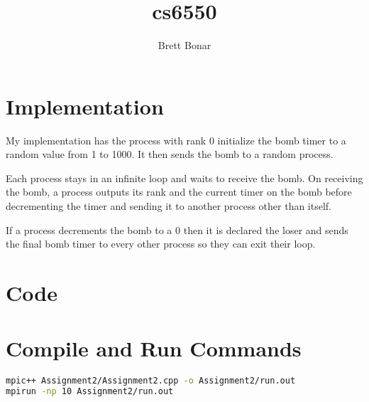 \documentclass{article}
\title{cs6550}
\author{ Brett Bonar }
\begin{document}
\maketitle

\section{Implementation}
My implementation has the process with rank 0 initialize the bomb timer to a random value from 1 to 1000. It then sends the bomb to a random process.

Each process stays in an infinite loop and waits to receive the bomb. On receiving the bomb, a process outputs its rank and the current timer on the bomb before decrementing the timer and sending it to another process other than itself.

If a process decrements the bomb to a 0 then it is declared the loser and sends the final bomb timer to every other process so they can exit their loop.

\section{Code}


\section{Compile and Run Commands}
\begin{lstlisting}[language=bash]
mpic++ Assignment2/Assignment2.cpp -o Assignment2/run.out
mpirun -np 10 Assignment2/run.out
\end{lstlisting}
\end{document}
